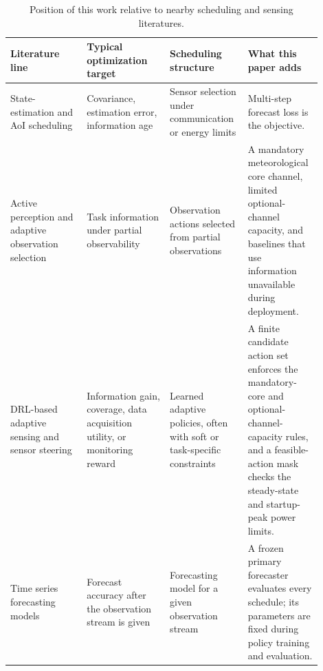 \begin{table}[htbp]
  \centering
  \caption{Position of this work relative to nearby scheduling and sensing literatures.}
  \label{tab:related_work_positioning}
  \footnotesize
  \setlength{\tabcolsep}{3.0pt}
  \renewcommand{\arraystretch}{0.96}
  \begin{tabular}{@{}>{\raggedright\arraybackslash}p{0.23\linewidth}>{\raggedright\arraybackslash}p{0.25\linewidth}>{\raggedright\arraybackslash}p{0.22\linewidth}>{\raggedright\arraybackslash}p{0.20\linewidth}@{}}
    \toprule
    Literature line & Typical optimization target & Scheduling structure & What this paper adds \\
    \midrule
    State-estimation and AoI scheduling
      & Covariance, estimation error, information age
      & Sensor selection under communication or energy limits
      & Multi-step forecast loss is the objective. \\
    Active perception and adaptive observation selection
      & Task information under partial observability
      & Observation actions selected from partial observations
      & A mandatory meteorological core channel, limited optional-channel capacity,
        and baselines that use information unavailable during deployment. \\
    DRL-based adaptive sensing and sensor steering
      & Information gain, coverage, data acquisition utility, or monitoring reward
      & Learned adaptive policies, often with soft or task-specific constraints
      & A finite candidate action set enforces the mandatory-core and
        optional-channel-capacity rules, and a feasible-action mask checks the
        steady-state and startup-peak power limits. \\
    Time series forecasting models
      & Forecast accuracy after the observation stream is given
      & Forecasting model for a given observation stream
      & A frozen primary forecaster evaluates every schedule; its parameters are fixed during policy training and evaluation. \\
    \bottomrule
  \end{tabular}
\end{table}
